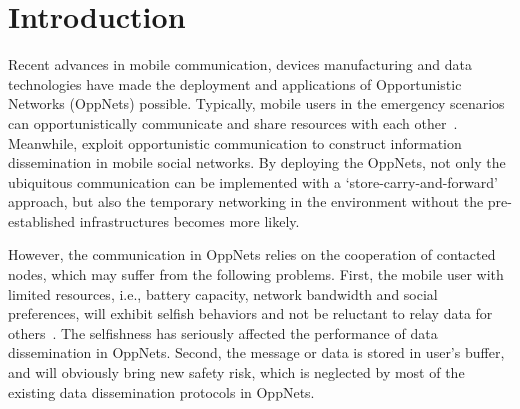 \section{Introduction}
\label{sec:intro}
Recent advances in mobile communication, 
devices manufacturing and data technologies have
made the deployment and applications of Opportunistic Networks 
(OppNets) possible. 
Typically,
mobile users in the emergency scenarios can
opportunistically communicate and share 
resources with each other~\cite{DBLP:journals/tsc/KhalidKKZ14,
DBLP:journals/tmc/ChatzopoulosAKH18,
DBLP:journals/tmc/LiQJHW014}. 
Meanwhile,
\cite{DBLP:journals/tmc/HanHKMSS12}
exploit opportunistic communication 
to construct information 
dissemination in mobile
social networks. 
By deploying the OppNets, 
not only the ubiquitous communication can be 
implemented with a `store-carry-and-forward' approach,
but also the temporary networking
in the environment without the pre-established infrastructures 
becomes more likely.

However,
the communication in OppNets relies on
the cooperation of contacted nodes,
which may suffer from the following problems.
First, 
the mobile user with limited resources,
i.e.,
battery capacity, 
network bandwidth and social preferences,
will exhibit selfish behaviors and not be 
reluctant to relay data for others~\cite{DBLP:journals/comsur/JedariXN18}.
The selfishness has seriously affected the performance
of data dissemination in OppNets.
Second,
the message or data is stored in user's buffer,
and will obviously bring new safety risk,
which is neglected by  
most of the existing data dissemination protocols in OppNets.   




